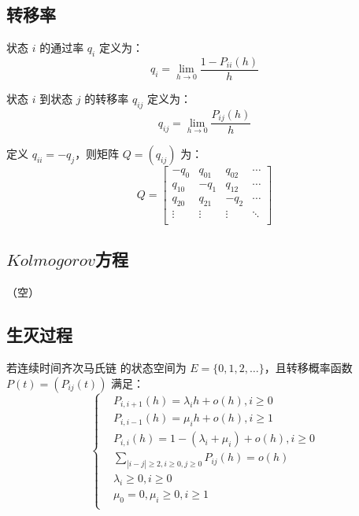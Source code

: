     \subsection{转移率}

        \begin{definition}[通过率]
            状态 $i$ 的通过率 $q_i$ 定义为：
            \[
                q_i = \lim_{h \to 0} \frac{1 - P_{ii}(h)}{h}
            \]
        \end{definition}

        \begin{definition}[转移率]
            状态 $i$ 到状态 $j$ 的转移率 $q_{ij}$ 定义为：
            \[
                q_{ij} = \lim_{h \to 0} \frac{P_{ij}(h)}{h}
            \]
        \end{definition}

        \begin{definition}[转移率矩阵]
            定义 $q_{ii} = -q_j$，则矩阵 $Q = \left( q_{ij} \right) $ 为：
            \[
                Q = 
                \begin{bmatrix}
                    -q_0 & q_{01} & q_{02} & \cdots \\
                    q_{10} & -q_1 & q_{12} & \cdots \\
                    q_{20} & q_{21} & -q_2 & \cdots \\
                    \vdots & \vdots & \vdots & \ddots \\
                \end{bmatrix}
            \]
        \end{definition}
    \subsection{$Kolmogorov$方程}
        （空）
    \subsection{生灭过程}
        \begin{definition}[生灭过程]
            若连续时间齐次马氏链 \ContinuousMarkovChain 的状态空间为 $E = \{0, 1, 2, \ldots \}$，且转移概率函数 $P(t) = (P_{ij}(t))$ 满足：
            \begin{equation*}
                \left\{
                    \begin{aligned}
                        & P_{i, i+1}(h) = \lambda_{i} h + o(h), i \geq 0 \\
                        & P_{i, i-1}(h) = \mu_i h + o(h), i \geq 1 \\
                        & P_{i, i}(h) = 1 - (\lambda_i + \mu_i) + o(h), i \geq 0 \\
                        & \sum\limits_{|i - j| \geq 2, i \geq 0, j \geq 0} P_{ij}(h) = o(h) \\
                        & \lambda_i \geq 0, i \geq 0 \\
                        & \mu_0 = 0, \mu_i \geq 0, i \geq 1 \\
                    \end{aligned}
                \right.
            \end{equation*}
        \end{definition}